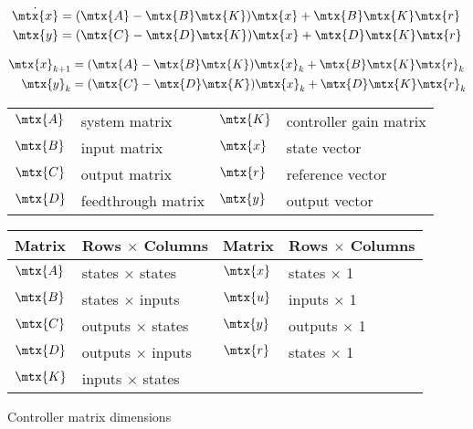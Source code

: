 \begin{theorem}

  \begin{align}
    \dot{\mtx{x}} &= (\mtx{A} - \mtx{B}\mtx{K})\mtx{x} + \mtx{B}\mtx{K}\mtx{r}
      \label{eq:s_ref_ctrl_x} \\
    \mtx{y} &= (\mtx{C} - \mtx{D}\mtx{K})\mtx{x} + \mtx{D}\mtx{K}\mtx{r}
      \label{eq:s_ref_ctrl_y}
  \end{align}

  \begin{align}
    \mtx{x}_{k+1} &= (\mtx{A} - \mtx{B}\mtx{K})\mtx{x}_k +
      \mtx{B}\mtx{K}\mtx{r}_k \label{eq:z_ref_ctrl_x} \\
    \mtx{y}_k &= (\mtx{C} - \mtx{D}\mtx{K})\mtx{x}_k + \mtx{D}\mtx{K}\mtx{r}_k
      \label{eq:z_ref_ctrl_y}
  \end{align}

  \begin{figurekey}
    \begin{tabular}{llll}
      $\mtx{A}$ & system matrix      & $\mtx{K}$ & controller gain matrix \\
      $\mtx{B}$ & input matrix       & $\mtx{x}$ & state vector \\
      $\mtx{C}$ & output matrix      & $\mtx{r}$ & \gls{reference} vector \\
      $\mtx{D}$ & feedthrough matrix & $\mtx{y}$ & output vector \\
    \end{tabular}
  \end{figurekey}
\end{theorem}

\begin{booktable}
  \begin{tabular}{|ll|ll|}
    \hline
    \rowcolor{headingbg}
    \textbf{Matrix} & \textbf{Rows $\times$ Columns} &
    \textbf{Matrix} & \textbf{Rows $\times$ Columns} \\
    \hline
    $\mtx{A}$ & states $\times$ states & $\mtx{x}$ & states $\times$ 1 \\
    $\mtx{B}$ & states $\times$ inputs & $\mtx{u}$ & inputs $\times$ 1 \\
    $\mtx{C}$ & outputs $\times$ states & $\mtx{y}$ & outputs $\times$ 1 \\
    $\mtx{D}$ & outputs $\times$ inputs & $\mtx{r}$ & states $\times$ 1 \\
    $\mtx{K}$ & inputs $\times$ states &  &  \\
    \hline
  \end{tabular}
  \caption{Controller matrix dimensions}
  \label{tab:ctrl_matrix_dims}
\end{booktable}

